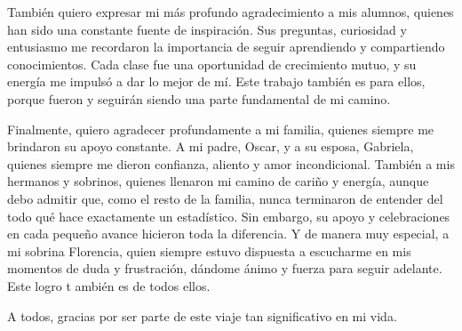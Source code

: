 También quiero expresar mi más profundo agradecimiento a mis alumnos, quienes han sido una constante fuente de inspiración. Sus preguntas, curiosidad y entusiasmo me recordaron la importancia de seguir aprendiendo y compartiendo conocimientos. Cada clase fue una oportunidad de crecimiento mutuo, y su energía me impulsó a dar lo mejor de mí. Este trabajo también es para ellos, porque fueron y seguirán siendo una parte fundamental de mi camino.

Finalmente, quiero agradecer profundamente a mi familia, quienes siempre me brindaron su apoyo constante. A mi padre, Oscar, y a su esposa, Gabriela, quienes siempre me dieron confianza, aliento y amor incondicional. También a mis hermanos y sobrinos, quienes llenaron mi camino de cariño y energía, aunque debo admitir que, como el resto de la familia, nunca terminaron de entender del todo qué hace exactamente un estadístico. Sin embargo, su apoyo y celebraciones en cada pequeño avance hicieron toda la diferencia. Y de manera muy especial, a mi sobrina Florencia, quien siempre estuvo dispuesta a escucharme en mis momentos de duda y frustración, dándome ánimo y fuerza para seguir adelante. Este logro t   ambién es de todos ellos.

A todos, gracias por ser parte de este viaje tan significativo en mi vida.
